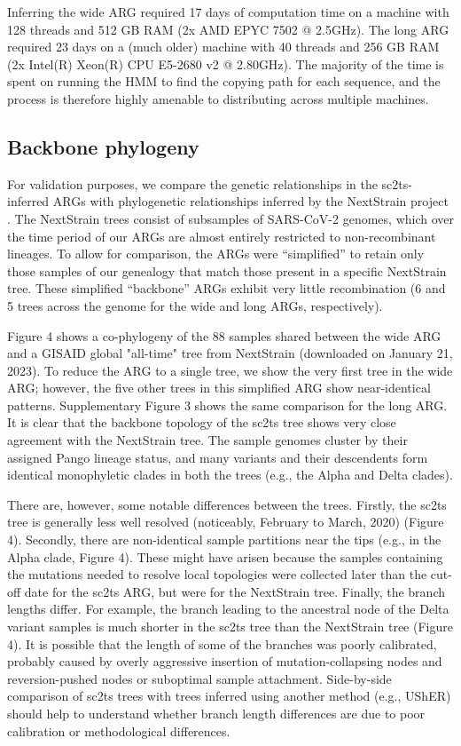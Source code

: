 \documentclass{article}
\begin{document}
Inferring the wide ARG required 17 days of computation time on a machine
with 128 threads and 512 GB RAM (2x AMD EPYC 7502 @ 2.5GHz).
The long ARG required 23 days on a (much older) machine
with 40 threads and 256 GB RAM (2x Intel(R) Xeon(R) CPU E5-2680 v2 @ 2.80GHz).
The majority of the time is spent on running the HMM to find the copying
path for each sequence, and the process is therefore highly amenable to
distributing across multiple machines.

\subsection{Backbone phylogeny}

For validation purposes, we compare the genetic relationships in the
sc2ts-inferred ARGs with phylogenetic relationships inferred by the NextStrain
project \citep{Hadfield2018-ef}. The NextStrain trees consist of subsamples of
SARS-CoV-2 genomes, which over the time period of our ARGs are almost entirely
restricted to non-recombinant lineages. To allow for comparison, the ARGs were
``simplified'' \citep{Kelleher2018-xc} to retain only those samples of our genealogy
that match those present in a specific NextStrain tree. These simplified
``backbone'' ARGs exhibit very little recombination (6 and 5 trees across the
genome for the wide and long ARGs, respectively).

Figure 4 shows a co-phylogeny of the 88 samples shared between the wide ARG and
a GISAID global "all-time" tree from NextStrain (downloaded on January 21,
2023). To reduce the ARG to a single tree, we show the very first tree in the
wide ARG; however, the five other trees in this simplified ARG show
near-identical patterns. Supplementary Figure 3 shows the same comparison for
the long ARG. It is clear that the backbone topology of the sc2ts tree shows
very close agreement with the NextStrain tree. The sample genomes cluster by
their assigned Pango lineage status, and many variants and their descendents
form identical monophyletic clades in both the trees (e.g., the Alpha and Delta
clades).

There are, however, some notable differences between the trees. Firstly, the
sc2ts tree is generally less well resolved (noticeably, February to March,
2020) (Figure 4). Secondly, there are non-identical sample partitions near the
tips (e.g., in the Alpha clade, Figure 4). These might have arisen because the
samples containing the mutations needed to resolve local topologies were
collected later than the cut-off date for the sc2ts ARG, but were for the
NextStrain tree. Finally, the branch lengths differ. For example, the branch
leading to the ancestral node of the Delta variant samples is much shorter in
the sc2ts tree than the NextStrain tree (Figure 4). It is possible that the
length of some of the branches was poorly calibrated, probably caused by overly
aggressive insertion of mutation-collapsing nodes and reversion-pushed nodes or
suboptimal sample attachment. Side-by-side comparison of sc2ts trees with trees
inferred using another method (e.g., UShER) should help to understand whether
branch length differences are due to poor calibration or methodological
differences.
\end{document}
